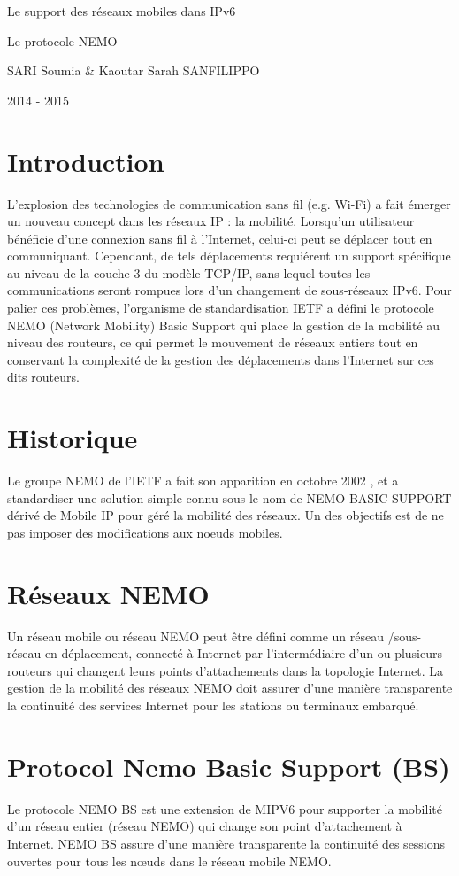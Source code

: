 \documentclass[12pt,a4paper]{report}
\newcommand{\myTitle}{
\begingroup 
\centering 


\vspace{\stretch{1}}
{\LARGE Le support des r\'{e}seaux mobiles dans IPv6}%

\vspace*{1\baselineskip}

\LARGE %
Le protocole NEMO
\vspace{\stretch{2}}

\vspace{\stretch{1}}
{\Large SARI Soumia \& Kaoutar Sarah SANFILIPPO\par} 
\vspace{\stretch{2}}

\vspace{\stretch{1}}
{\large 2014 - 2015}
\vspace{\stretch{2}}%
\setcounter{page}{0}

\endgroup}
\begin{document}
\thispagestyle{empty}
\myTitle

\renewcommand{\contentsname}{Sommaire}
\tableofcontents

\newpage
\section{Introduction}

L'explosion des technologies de communication sans fil (e.g. Wi-Fi) a fait \'{e}merger un nouveau
concept dans les r\'{e}seaux IP : la mobilit\'{e}. Lorsqu'un utilisateur b\'{e}n\'{e}ficie d'une connexion sans fil \`a
l'Internet, celui-ci peut se d\'{e}placer tout en communiquant. Cependant, de tels d\'{e}placements
requi\'{e}rent un support sp\'{e}cifique au niveau de la couche 3 du mod\`{e}le TCP/IP, sans lequel toutes les
communications seront rompues lors d'un changement de sous-r\'{e}seaux IPv6. Pour palier ces
probl\`{e}mes, l'organisme de standardisation IETF a d\'{e}fini le protocole NEMO (Network Mobility) Basic
Support qui place la gestion de la mobilit\'{e} au niveau des routeurs, ce qui permet le mouvement de
r\'{e}seaux entiers tout en conservant la complexit\'{e} de la gestion des d\'{e}placements dans l'Internet sur
ces dits routeurs.

\section{Historique}

Le groupe NEMO de l'IETF a fait son apparition en octobre 2002 , et a standardiser une solution simple connu sous
le nom de NEMO BASIC SUPPORT d\'eriv\'e de Mobile IP pour g\'er\'e la mobilit\'e des r\'eseaux.
Un des objectifs est de ne pas imposer des modifications aux noeuds mobiles.
 
\section{R\'eseaux NEMO}
Un r\'eseau mobile ou r\'eseau NEMO peut \^etre d\'efini comme un r\'eseau /sous-r\'eseau en d\'eplacement, connect\'e \`a Internet par l'interm\'ediaire d'un ou plusieurs routeurs qui changent leurs points d'attachements dans la topologie Internet. La gestion de la mobilit\'e des r\'eseaux NEMO doit assurer d'une mani\`ere transparente la continuit\'e des services Internet  pour les stations ou terminaux embarqu\'e.

\section{Protocol Nemo  Basic Support (BS)}
Le protocole NEMO BS est une extension de MIPV6 pour supporter la mobilit\'{e} d'un 
r\'{e}seau entier (r\'{e}seau NEMO) qui change son point d'attachement \`{a} Internet. NEMO BS  assure d'une mani\`ere transparente la continuit\'e des sessions ouvertes pour tous les nœuds dans le r\'eseau mobile NEMO.
\end{document}
